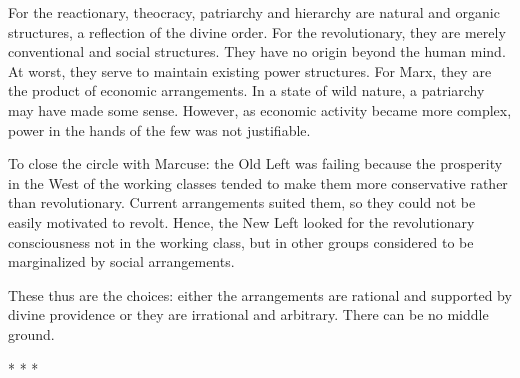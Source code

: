 For the reactionary, theocracy, patriarchy and hierarchy are natural and organic structures, a reflection of the divine order. For the revolutionary, they are merely conventional and social structures. They have no origin beyond the human mind. At worst, they serve to maintain existing power structures. For Marx, they are the product of economic arrangements. In a state of wild nature, a patriarchy may have made some sense. However, as economic activity became more complex, power in the hands of the few was not justifiable.

To close the circle with Marcuse: the Old Left was failing because the prosperity in the West of the working classes tended to make them more conservative rather than revolutionary. Current arrangements suited them, so they could not be easily motivated to revolt. Hence, the New Left looked for the revolutionary consciousness not in the working class, but in other groups considered to be marginalized by social arrangements.

These thus are the choices: either the arrangements are rational and supported by divine providence or they are irrational and arbitrary. There can be no middle ground.




\begin{center}* * *\end{center}

